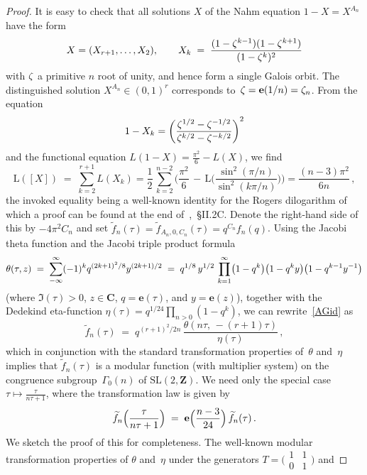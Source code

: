 \documentclass[12pt,reqno]{amsart}
\theoremstyle{definition}
\newcommand{\changed}[1]{{#1}}
\def\be{\begin{equation}}
\def\ee{\end{equation}}
\def\m{\,-\,}
\def\={\;=\;}
\def\Z{\mathbf Z}   %
\def\C{\mathbf C}   %
\def\tf{\widetilde f}
\def\L{\mathrm L}
\def\SL{\mathrm{SL}}
\def\th{\theta}
\def\nn{n}
\def\e{\mathbf{e}}
\def\SL{\mathrm{SL}}
\begin{document}
\begin{proof}
It is easy to check that all solutions $X$ of the Nahm equation $1-X=X^{A_\nn}$ 
have the form
$$
X=(X_{r+1},\dots,X_2),
\qquad X_k  \= \frac{(1-\z^{k-1})(1-\z^{k+1})}{(1-\z^{k})^2}
$$
with $\zeta$ a primitive $\nn$ root of unity, and hence form a single Galois 
orbit. The distinguished solution $X^{A_\nn}\in(0,1)^r$ corresponds 
to~$\z=\e(1/\nn)=\z_\nn$.   From the equation
\be \label{eq:comparetorsion}
1-X_k=\left(\frac{\z^{1/2}-\z^{-1/2}}{\z^{k/2}-\z^{-k/2}}\right)^2 
\ee
and the functional equation $L(1-X)=\frac{\pi^2}6-L(X)$, we find
\be
\L(\changed{[X]}) \=  \changed{\sum_{k=2}^{r+1} L(X_k)  }
= \frac12\,\sum_{\changed{k=2}}^{\changed{n-2}}\biggl(\frac{\pi^2}6 
\m \L\biggl(\frac{\sin^2(\pi/n)}{\sin^2(k \pi/n)}\biggr)\biggr) 
=  \frac{(n-3)\pi^2}{6n}\,, 
\ee
the invoked equality being a well-known identity for the Rogers dilogarithm 
of which a proof can be found at the end of~\cite{Zagier},~{\S}II.2C. 
Denote the right-hand side of this by $-4\pi^2C_\nn$ and set 
$\tf_\nn(\tau)=\tf_{A_n,0,C_n}(\tau)=q^{C_\nn}f_\nn(q)$. %
Using the Jacobi theta function and \changed{the} Jacobi triple product formula
$$
\th(\tau,z) \= \sum_{-\infty}^{\infty} (-1)^{k} q^{(2k+1)^2/8} y^{(2k+1)/2} 
\= q^{1/8}\,y^{1/2}\,\prod_{k=1}^\infty 
\bigl(1-q^k\bigr)\bigl(1-q^ky\bigr)\bigl(1-q^{k-1}y\i\bigr)
$$
(where $\Im(\tau)>0$, $z\in\C$, $q=\e(\tau)$, and $y=\e(z)$), together with 
the Dedekind eta-function $\eta(\tau)=q^{1/24}\prod_{n>0}(1-q^k)$, we can 
rewrite~\eqref{AGid} as 
$$
\tf_\nn(\tau) \= q^{(r+1)^2/2n}\,\frac{\th(n\tau,\,-(r+1)\tau)}{\eta(\tau)}\,,
$$
which in conjunction with the standard transformation properties of~$\th$ 
and~$\eta$ implies that $\tf_\nn(\tau)$ is a modular function (with multiplier 
system) on the congruence subgroup~$\Gamma_0(n)$ of $\SL(2,\Z)$.  We need 
only the special case $\tau\mapsto\frac\tau{n\tau+1}$, where the 
transformation law is given by
\be
\label{WasLemma}
\tf_\nn\Bigl(\frac\tau{n\tau+1}\Bigr) 
\= \e\Bigl(\frac{n-3}{24}\Bigr)\,\tf_\nn(\tau)\,.
\ee
\changed{We sketch the proof of this for completeness.}
The well-known modular transformation 
properties of $\theta$ and~$\eta$ under the generators 
$T=\bigl(\begin{smallmatrix}1&1\\0&1\end{smallmatrix})$ and 

\end{proof}
\end{document}

